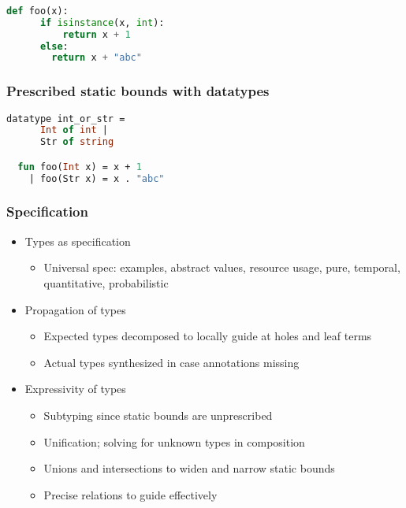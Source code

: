 \documentclass{beamer}
\begin{document}

\begin{frame}[fragile]
  \frametitle{}

  \begin{lstlisting}[language=Python]
  def foo(x):
      if isinstance(x, int):
          return x + 1 
      else:
        return x + "abc"
  \end{lstlisting}
\end{frame}

\begin{frame}[fragile]
  \frametitle{Prescribed static bounds with datatypes}

  \begin{lstlisting}[language=ML]
  datatype int_or_str = 
      Int of int | 
      Str of string

  fun foo(Int x) = x + 1
    | foo(Str x) = x . "abc"
  \end{lstlisting}

\end{frame}

\begin{frame}[fragile]
  \frametitle{Specification}
  \begin{itemize}
  \item Types as specification 
    \begin{itemize}
    \item Universal spec: examples, abstract values, resource usage, 
      pure, temporal, quantitative, probabilistic 
    \end{itemize}
  \item Propagation of types   
    \begin{itemize}
    \item Expected types decomposed to locally guide at holes and leaf terms   
    \item Actual types synthesized in case annotations missing 
    \end{itemize}

  \item Expressivity of types    
    \begin{itemize}
    \item Subtyping since static bounds are unprescribed 
    \item Unification; solving for unknown types in composition 
    \item Unions and intersections to widen and narrow static bounds 
    \item Precise relations to guide effectively   
    \end{itemize}
  \end{itemize}
\end{frame}
\end{document}
